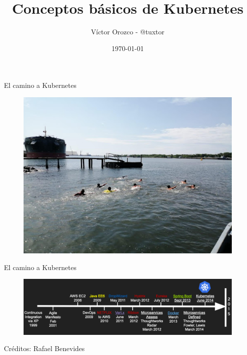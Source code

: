 \documentclass[aspectratio=169]{beamer}
\title{Conceptos básicos de Kubernetes}
\author{Víctor Orozco - @tuxtor}
\institute{Academik}
\date{\today}
\begin{document}
{
    \frame{\titlepage}
}

\begin{frame}{El camino a Kubernetes}
    \begin{figure}
        \centering
        \includegraphics[width=0.5\linewidth]{Images/run}
    \end{figure}
\end{frame}


\begin{frame}{El camino a Kubernetes}
    \begin{figure}
        \centering
        \includegraphics[width=\linewidth]{Images/timeline.png}
        \label{fig:container}
    \end{figure}

    Créditos: Rafael Benevides
\end{frame}
\end{document}
